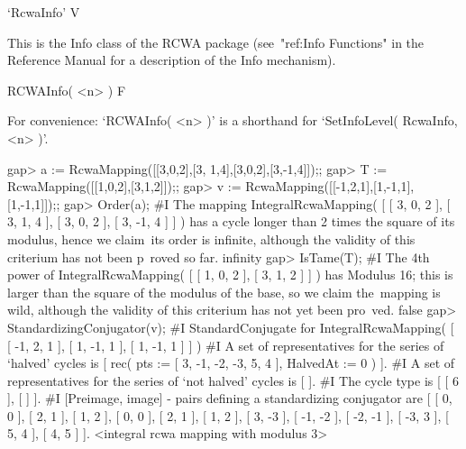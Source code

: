 


\>`RcwaInfo' V

This is the Info class of the RCWA package (see~"ref:Info Functions" 
in the {\GAP} Reference Manual for a description of the Info mechanism).

\>RCWAInfo( <n> ) F

For convenience: `RCWAInfo( <n> )' is a shorthand for
`SetInfoLevel( RcwaInfo, <n> )'.

\beginexample
gap> a := RcwaMapping([[3,0,2],[3, 1,4],[3,0,2],[3,-1,4]]);;
gap> T := RcwaMapping([[1,0,2],[3,1,2]]);;
gap> v := RcwaMapping([[-1,2,1],[1,-1,1],[1,-1,1]]);;
gap> Order(a);
#I  The mapping IntegralRcwaMapping( [ [ 3, 0, 2 ], [ 3, 1, 4 ], [ 3, 0, 2 ], 
  [ 3, -1, 4 ] 
 ] ) has a cycle longer than 2 times the square of its modulus, hence we claim\
 its order is infinite, although the validity of this criterium has not been p\
roved so far.
infinity
gap> IsTame(T);
#I  The 4th power of IntegralRcwaMapping( [ [ 1, 0, 2 ], [ 3, 1, 2 ] 
 ] ) has Modulus 
16; this is larger than the square of the modulus of the base, so we claim the\
 mapping is wild, although the validity of this criterium has not yet been pro\
ved.
false
gap> StandardizingConjugator(v);
#I  StandardConjugate for IntegralRcwaMapping( 
[ [ -1, 2, 1 ], [ 1, -1, 1 ], [ 1, -1, 1 ] ] )
#I  A set of representatives for the series of `halved' cycles is [ rec(
      pts := [ 3, -1, -2, -3, 5, 4 ],
      HalvedAt := 0 ) ].
#I  A set of representatives for the series of `not halved' cycles is [  ].
#I  The cycle type is [ [ 6 ], [  ] ].
#I  [Preimage, image] - pairs defining a standardizing conjugator are 
[ [ 0, 0 ], [ 2, 1 ], [ 1, 2 ], [ 0, 0 ], [ 2, 1 ], [ 1, 2 ], [ 3, -3 ], 
  [ -1, -2 ], [ -2, -1 ], [ -3, 3 ], [ 5, 4 ], [ 4, 5 ] ].
<integral rcwa mapping with modulus 3>
\endexample

